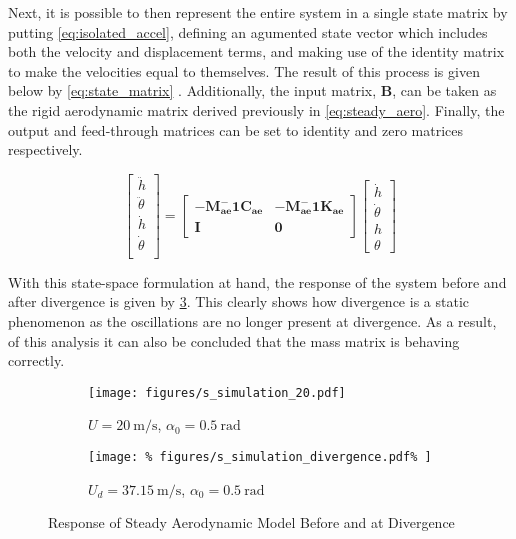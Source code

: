 Next, it is possible to then represent the entire system in a single state
matrix by putting \cref{eq:isolated_accel}, defining an agumented state vector
which includes both the velocity and displacement terms, and making use of the
identity matrix to make the velocities equal to themselves. The result of this
process is given below by \cref{eq:state_matrix}
\autocite[s.4]{andrianneLectureDynamicAeroelasticity}. Additionally, the input
matrix, $\bm{B}$, can be taken as the rigid aerodynamic matrix derived
previously in \cref{eq:steady_aero}. Finally, the output and feed-through
matrices can be set to identity and zero matrices respectively.

\begin{equation}
    \label{eq:state_matrix}
    \begin{bmatrix}
        \ddot{h} \\
        \ddot{\theta} \\
        \dot{h} \\
        \dot{\theta} \\
    \end{bmatrix} =
    \begin{bmatrix}
        \bm{-M_{ae}^-1 C_{ae}} &
        \bm{-M_{ae}^-1 K_{ae}} \\
        \bm{I} & \bm{0}
    \end{bmatrix}
    \begin{bmatrix}
        \dot{h} \\
        \dot{\theta} \\
        h \\
        \theta
    \end{bmatrix}
\end{equation}

With this state-space formulation at hand, the response of the system before
and after divergence is given by \cref{fig:s_simulations}. This clearly shows
how divergence is a static phenomenon as the oscillations are no longer present
at divergence. As a result, of this analysis it can also be concluded that the
mass matrix is behaving correctly.

\begin{figure}[H]
    \centering
    \begin{subfigure}[b]{0.5\textwidth}
        \centering
        \texttt{[image: figures/s\_simulation\_20.pdf]}
        \caption{$U =\SI{20}{\meter\per\second}$, $\alpha_0=\SI{0.5}{\radian}$}
        \label{fig:s_simulation_20}
    \end{subfigure}%
    \begin{subfigure}[b]{0.5\textwidth}
        \centering
        \texttt{[image: \%
            figures/s\_simulation\_divergence.pdf\%
        ]}
        \caption{$U_d =\SI{37.15}{\meter\per\second}$, $\alpha_0=\SI{0.5}{\radian}$}
        \label{fig:s_simulation_divergence}
    \end{subfigure}
    \caption{Response of Steady Aerodynamic Model Before and at Divergence}
    \label{fig:s_simulations}
\end{figure}

